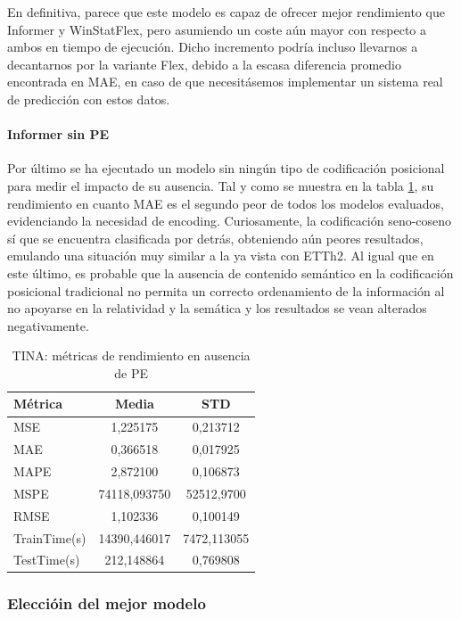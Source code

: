 En definitiva, parece que este modelo es capaz de ofrecer mejor rendimiento que Informer y WinStatFlex, pero asumiendo un coste aún mayor con respecto a ambos en tiempo de ejecución. Dicho incremento podría incluso llevarnos a decantarnos por la variante Flex, debido a la escasa diferencia promedio encontrada en MAE, en caso de que necesitásemos implementar un sistema real de predicción con estos datos.

\paragraph{Informer sin PE}

Por último se ha ejecutado un modelo sin ningún tipo de codificación posicional para medir el impacto de su ausencia. Tal y como se muestra en la tabla \ref{tinanope}, su rendimiento en cuanto MAE es el segundo peor de todos los modelos evaluados, evidenciando la necesidad de encoding. Curiosamente, la codificación seno-coseno sí que se encuentra clasificada por detrás, obteniendo aún peores resultados, emulando una situación muy similar a la ya vista con ETTh2. Al igual que en este último, es probable que la ausencia de contenido semántico en la codificación posicional tradicional no permita un correcto ordenamiento de la información al no apoyarse en la relatividad y la semática y los resultados se vean alterados negativamente.

\begin{table}[!ht]
	\centering
	\begin{tabular}{l|c|c}
		\toprule
		Métrica & Media & STD \\
		\midrule
		MSE & 1,225175 & 0,213712 \\
		MAE & 0,366518 & 0,017925 \\
		MAPE & 2,872100 & 0,106873 \\
		MSPE & 74118,093750 & 52512,9700 \\
		RMSE & 1,102336 & 0,100149 \\
		TrainTime(s) & 14390,446017 & 7472,113055 \\
		TestTime(s) & 212,148864 & 0,769808 \\
		\bottomrule
	\end{tabular}
	\caption{TINA: métricas de rendimiento  en ausencia de PE}
	\label{tinanope}
\end{table}


\subsubsection{Eleccióin del mejor modelo}

